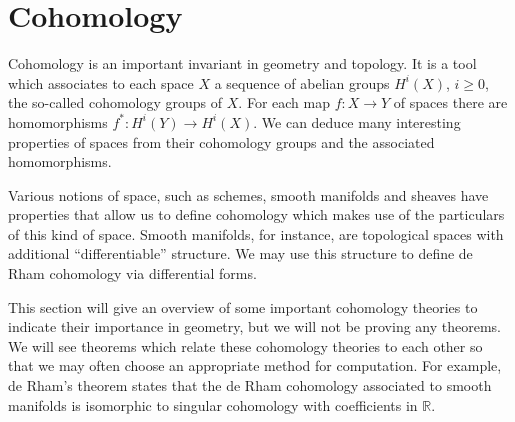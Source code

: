 

\section{Cohomology}
Cohomology is an important invariant in geometry and topology. It is a tool which associates to each space $X$ a sequence of abelian groups $H^i(X)$, $i \ge 0$, the so-called cohomology groups of $X$. For each map $f: X \to Y$ of spaces there are homomorphisms $f^*: H^i(Y) \to H^i(X)$. We can deduce many interesting properties of spaces from their cohomology groups and the associated homomorphisms.

Various notions of space, such as schemes, smooth manifolds and sheaves have properties that allow us to define cohomology which makes use of the particulars of this kind of space. Smooth manifolds, for instance, are topological spaces with additional “differentiable” structure.  We may use this structure to define de Rham cohomology via differential forms.

This section will give an overview of some important cohomology theories to indicate their importance in geometry, but we will not be proving any theorems.
We will see theorems which relate these cohomology theories to each other so that we may often choose an appropriate method for computation. For example, de Rham's theorem states that the de Rham cohomology associated to smooth manifolds is isomorphic to singular cohomology with coefficients in $\mathbb{R}$.

